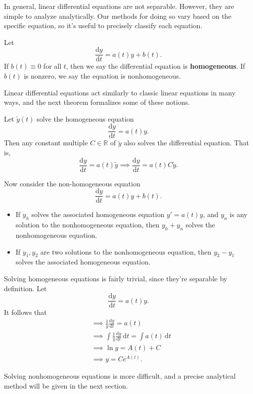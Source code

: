 In general, linear differential equations are not separable. However, they are simple to analyze analytically. Our methods for doing so vary based on the specific equation, so it's useful to precisely classify each equation.
\begin{definition}[Homogeneous]\label{dfn:9}
	Let
	\[
		\frac{\mathrm{d}y}{\mathrm{d}t} =a(t)y+b(t)
	.\]
	If $b(t)\equiv 0$ for all $t$, then we say the differential equation is \textbf{homogeneous}. If $b(t)$ is nonzero, we say the equation is nonhomogeneous.
\end{definition}

Linear differential equations act similarly to classic linear equations in many ways, and the next theorem formalizes some of these notions.
\begin{theorem}[Linearity]\label{thm:6}
	Let $\tilde{y}(t)$ solve the homogeneous equation
	\[
		\frac{\mathrm{d}y}{\mathrm{d}t} =a(t)y
	.\]
	Then any constant multiple $C\in\mathbb{R}$ of $\tilde{y}$ also solves the differential equation. That is,
	\[
		\frac{\mathrm{d}y}{\mathrm{d}t} =a(t)\tilde{y} \implies \frac{\mathrm{d}y}{\mathrm{d}t} =a(t)C\tilde{y}
	.\]

	Now consider the non-homogeneous equation
	\[
		\frac{\mathrm{d}y}{\mathrm{d}t} =a(t)y+b(t)
	.\]
	\begin{itemize}
		\item If $y_h$ solves the associated homogeneous equation $y'=a(t)y$, and $y_n$ is any solution to the nonhomogeneous equation, then $y_h+y_n$ solves the nonhomogeneous equation.
		\item If $y_1,y_2$ are two solutions to the nonhomogeneous equation, then $y_2-y_1$ solves the associated homogeneous equation.
	\end{itemize}
\end{theorem}

Solving homogeneous equations is fairly trivial, since they're separable by definition. Let
\[
	\frac{\mathrm{d}y}{\mathrm{d}t} =a(t)y
.\]
It follows that
\begin{align*}
	&\implies  \frac{1}{y}\frac{\mathrm{d}y}{\mathrm{d}t} =a(t)\\
	&\implies \int \frac{1}{y}\frac{\mathrm{d}y}{\mathrm{d}t}  \,\mathrm{d} t=\int a(t) \,\mathrm{d} t\\
	&\implies \ln y=A(t)+C\\
	&\implies y=Ce^{A(t)}
.\end{align*}

Solving nonhomogeneous equations is more difficult, and a precise analytical method will be given in the next section.
